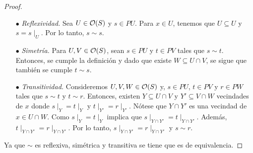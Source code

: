 \begin{proof}
\text{}
\begin{enumerate}
  \item[$\bullet$]  \emph{Reflexividad.} Sea $U\in{\mathcal O}(S)$ y $s\in PU$. Para $x\in U$, tenemos que $U\subseteq U$ y $s=s\mid_U$. Por lo tanto, $s\sim s$.
   \item[$\bullet$] \emph{Simetría.} Para $U,V\in{\mathcal O}(S)$, sean $s\in PU$ y $t\in PV$ tales que $s\sim t$. Entonces, se cumple la definición y dado que existe $W\subseteq U\cap V$, se sigue que también se cumple $t\sim s$.
    \item[$\bullet$]\emph{Transitividad.} Consideremos $U,V,W\in{\mathcal O}(S)$ y, $s\in PU$, $t\in PV$ y $r\in PW$ tales que $s\sim t$ y $t\sim r$. Entonces, existen $Y\subseteq U\cap V$ y $Y'\subseteq V\cap W$ vecindades de $x$ donde $s\mid_Y=t\mid_{Y}$ y $t\mid_{Y'}=r\mid_{Y'}$. Nótese que $Y\cap Y'$ es una vecindad de $x\in U\cap W$. Como $s\mid_Y=t\mid_Y$ implica que $s\mid_{Y\cap Y'}=t\mid_{Y\cap Y'}$. Además, $t\mid_{Y\cap Y'}=r\mid_{Y\cap Y'}$. Por lo tanto, $s\mid_{Y\cap Y'}=r\mid_{Y \cap Y'}$ y $s\sim r$.
    \end{enumerate}
    Ya que $\sim$ es reflexiva, simétrica y transitiva se tiene que es de equivalencia.
\end{proof}

